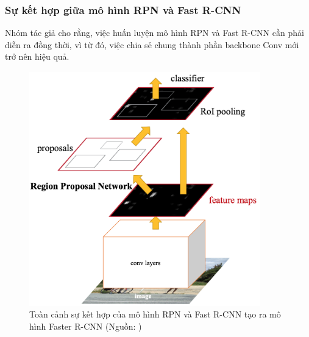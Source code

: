 {    \subsubsection{Sự kết hợp giữa mô hình RPN và Fast R-CNN}
    Nhóm tác giả cho rằng, việc huấn luyện mô hình RPN và Fast R-CNN cần phải diễn ra đồng thời, vì từ đó, việc chia sẻ chung thành phần backbone Conv mới trở nên hiệu quả.

    \begin{figure}[H]
        \centering
        \includegraphics[width=10cm] {images/faster_rcnn_model}
        \caption{Toàn cảnh sự kết hợp của mô hình RPN và Fast R-CNN tạo ra mô hình Faster R-CNN (Nguồn: \cite{ren2015faster})}
        \label{fig:faster_model}
    \end{figure}

}
